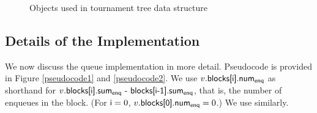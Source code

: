 \begin{figure}
\begin{algorithmic}[1]



\end{algorithmic}
\caption{Objects used in tournament tree data structure \label{object-fields}}
\end{figure}

\subsection{Details of the Implementation}

We now discuss the queue implementation in more detail.  Pseudocode is provided in Figure \ref{pseudocode1} and \ref{pseudocode2}.
We use $v.\mbox{\sf blocks[i].num\textsubscript{enq}}$ as shorthand for 
$v.\mbox{\sf blocks[i].sum\textsubscript{enq} - blocks[i-1].sum\textsubscript{enq}}$, that is, 
the number of enqueues in the block.  (For $\mbox{\sf i}=0$, $v.\mbox{\sf blocks[0].num\textsubscript{enq}} = 0$.)
We use  similarly.

